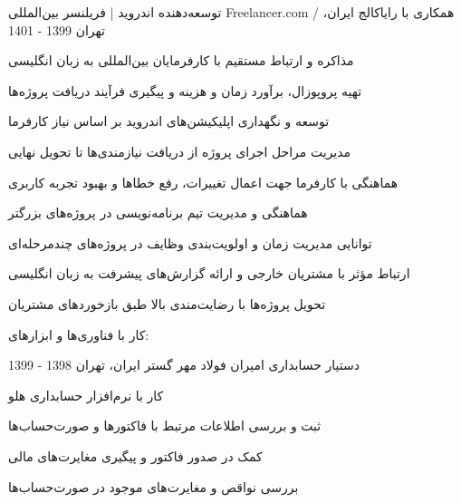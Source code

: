 

\begin{cventries}

  \cventry
    {توسعه‌دهنده اندروید | فریلنسر بین‌المللی} %
    {Freelancer.com / همکاری با رایاکالج} %
    {ایران، تهران} %
    {1399 - 1401} %
    {
      \begin{cvitems} %
  		\item {مذاکره و ارتباط مستقیم با کارفرمایان بین‌المللی به زبان انگلیسی}
		\item {تهیه پروپوزال، برآورد زمان و هزینه و پیگیری فرآیند دریافت پروژه‌ها}
		\item {توسعه و نگهداری اپلیکیشن‌های اندروید بر اساس نیاز 	کارفرما}
		\item {مدیریت مراحل اجرای پروژه از دریافت نیازمندی‌ها تا تحویل 	نهایی}
		\item {هماهنگی با کارفرما جهت اعمال تغییرات، رفع خطاها و بهبود تجربه کاربری}
		\item {هماهنگی و مدیریت تیم برنامه‌نویسی در پروژه‌های بزرگتر}
		\item {توانایی مدیریت زمان و اولویت‌بندی وظایف در پروژه‌های چندمرحله‌ای}
		\item {ارتباط مؤثر با مشتریان خارجی و ارائه گزارش‌های پیشرفت به زبان انگلیسی}
		\item {تحویل پروژه‌ها با رضایت‌مندی بالا طبق بازخوردهای مشتریان}
		\item {کار با فناوری‌ها و ابزارهای:
			}
      \end{cvitems}
    }

  \cventry
{دستیار حسابداری} %
{امیران فولاد مهر گستر} %
{ایران، تهران} %
{1398 - 1399} %
{
	\begin{cvitems} %
	 	\item {کار با نرم‌افزار حسابداری هلو}
        \item {ثبت و بررسی اطلاعات مرتبط با فاکتورها و صورت‌حساب‌ها}
		\item {کمک در صدور فاکتور و پیگیری مغایرت‌های مالی}
		\item {بررسی نواقص و مغایرت‌های موجود در صورت‌حساب‌ها}
	\end{cvitems}
}

  
\end{cventries}
